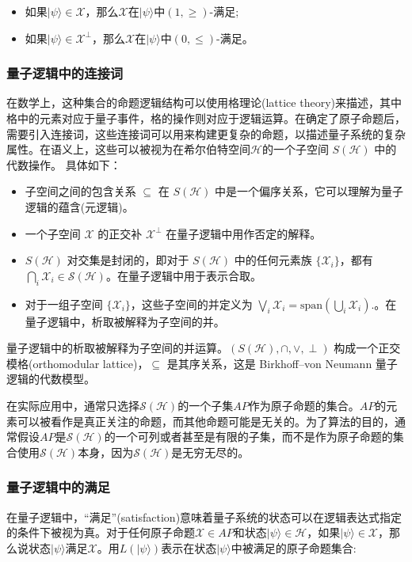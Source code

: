 \begin{itemize}
\item 如果$|\psi\rangle \in \mathcal{X}$，那么$\mathcal{X}$在$|\psi\rangle$中$(1, \geq)$-满足;
\item 如果$|\psi\rangle \in \mathcal{X}^\perp$，那么$\mathcal{X}$在$|\psi\rangle$中$(0, \leq)$-满足。
\end{itemize}

\subsubsection*{量子逻辑中的连接词}
\label{sec-connect}
在数学上，这种集合的命题逻辑结构可以使用格理论(lattice theory)来描述，其中格中的元素对应于量子事件，格的操作则对应于逻辑运算。在确定了原子命题后，需要引入连接词，这些连接词可以用来构建更复杂的命题，以描述量子系统的复杂属性。在语义上，这些可以被视为在希尔伯特空间$\mathcal{H}$的一个子空间 \(S(\mathcal{H})\) 中的代数操作。
具体如下：

\begin{itemize}
    \item 子空间之间的包含关系 \( \subseteq \) 在 \(S(\mathcal{H})\) 中是一个偏序关系，它可以理解为量子逻辑的蕴含(元逻辑)。
    \item 一个子空间 \( \mathcal{X} \) 的正交补 \( \mathcal{X}^\perp \) 在量子逻辑中用作否定的解释。
    \item \(S(\mathcal{H})\) 对交集是封闭的，即对于 \(S(\mathcal{H})\) 中的任何元素族 \( \{\mathcal{X}_i\} \)，都有$\bigcap_{i} \mathcal{X}_{i} \in \mathcal{S}(\mathcal{H})$。在量子逻辑中用于表示合取。
    \item 对于一组子空间 \(\{\mathcal{X}_i\}\)，这些子空间的并定义为
    \(
    \bigvee_i \mathcal{X}_i = \text{span} \left( \bigcup_i \mathcal{X}_i \right).
    \)。在量子逻辑中，析取被解释为子空间的并。
\end{itemize}


量子逻辑中的析取被解释为子空间的并运算。\( (S(\mathcal{H}), \cap, \vee, \perp) \) 构成一个正交模格(orthomodular lattice)，\( \subseteq \) 是其序关系，这是 Birkhoff–von Neumann 量子逻辑的代数模型。

在实际应用中，通常只选择$\mathcal{S}(\mathcal{H})$的一个子集$AP$作为原子命题的集合。$AP$的元素可以被看作是真正关注的命题，而其他命题可能是无关的。为了算法的目的，通常假设$AP$是$\mathcal{S}(\mathcal{H})$的一个可列或者甚至是有限的子集，而不是作为原子命题的集合使用$\mathcal{S}(\mathcal{H})$本身，因为$\mathcal{S}(\mathcal{H})$是无穷无尽的。

\subsubsection*{量子逻辑中的满足}
在量子逻辑中，“满足”(satisfaction)意味着量子系统的状态可以在逻辑表达式指定的条件下被视为真。对于任何原子命题$\mathcal{X} \in AP$和状态$|\psi\rangle \in \mathcal{H}$，如果$|\psi\rangle \in \mathcal{X}$，那么说状态$|\psi\rangle$满足$\mathcal{X}$。用$L(|\psi\rangle)$表示在状态$|\psi\rangle$中被满足的原子命题集合:

